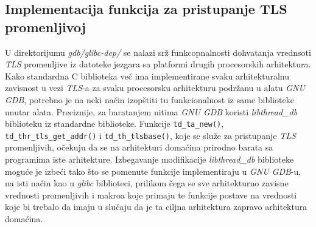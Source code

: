 \documentclass[12pt,oneside]{memoir}
\begin{document}
\subsection{Implementacija funkcija za pristupanje TLS promenljivoj}

U direktorijumu \emph{gdb/glibc-dep/} se nalazi srž funkcopnalnosti dohvatanja vrednsoti \emph{TLS} promenljive iz datoteke jezgara sa platformi drugih procesorskih arhitektura. Kako standardna C biblioteka već ima implementirane svaku arhitekturalnu zavisnost u vezi \emph{TLS}-a za svaku procesorsku arhitekturu podržanu u alatu \emph{GNU GDB}, potrebno je na neki način izopštiti tu funkcionalnost iz same biblioteke unutar alata. Preciznije, za baratanjem nitima \emph{GNU GDB} koristi \emph{libthread\_db} biblioteku iz standardne biblioteke. Funkcije \texttt{td\_ta\_new()}, \texttt{td\_thr\_tls\_get\_addr()} i \texttt{td\_th\_tlsbase()}, koje se služe za pristupanje \emph{TLS} promenljivih, očekuju da se na arhitekturi domaćina prirodno barata sa programima iste arhitekture. Izbegavanje modifikacije \emph{libthread\_db} biblioteke moguće je izbeći tako što se pomenute funkcije implementiraju u \emph{GNU GDB}-u, na isti način kao u \emph{glibc} biblioteci, prilikom čega se sve arhitekturno zavisne vrednosti promenljivih i makroa koje primaju te funkcije postave na vrednosti koje bi trebalo da imaju u slučaju da je ta ciljna arhitektura zapravo arhitektura domaćina.
\end{document}
